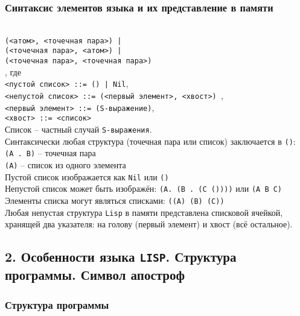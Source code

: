 \subsubsection*{Синтаксис элементов языка и их представление в памяти}

\\
{\texttt{(<атом>, <точечная пара>) |}}\\
{\texttt{(<точечная пара>, <атом>) |}}\\
{\texttt{(<точечная пара>, <точечная пара>)}}\\

, где\\
{\texttt{<пустой список> ::= () | Nil}},\\
{\texttt{<непустой список> ::= (<первый элемент>, <хвост>) }},\\
{\texttt{<первый элемент> ::= (S-выражение)}},\\
{\texttt{<хвост> ::= <список>}}\\

\noindent Список -- частный случай {\texttt{S-выражения}}.\\
Синтаксически любая структура (точечная пара или список) заключается в {\texttt{()}}:\\
{\texttt{(A . B)}} -- точечная пара\\
{\texttt{(A)}} -- список из одного элемента\\
Пустой список изображается как {\texttt{Nil}} или {\texttt{()}}\\
Непустой список может быть изображён: {\texttt{(A. (B . (C ())))}} или {\texttt{(A B C)}}\\
Элементы списка могут являться списками: {\texttt{((A) (B) (C))}}\\
Любая непустая структура {\texttt{Lisp}} в памяти представлена списковой ячейкой, хранящей два указателя: на голову (первый элемент) и хвост (всё остальное).

\subsection*{2. Особенности языка \texttt{LISP}. Структура программы. Символ апостроф}

\subsubsection*{Структура программы}

